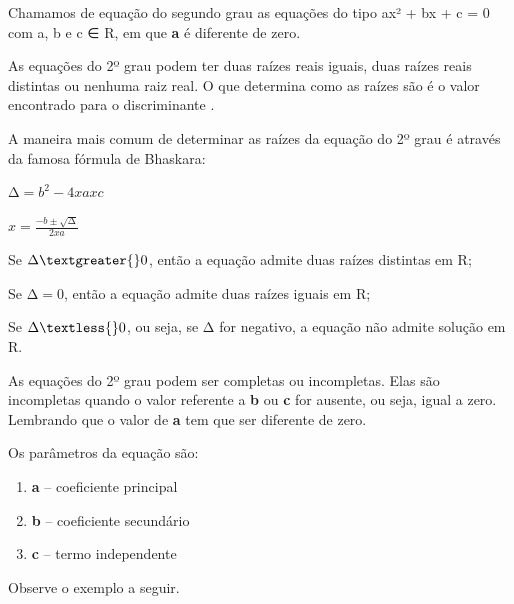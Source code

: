 \begin{escolha}
\begin{boxmedio}
\begin{boxmedio}
{\begin{boxpeq}
\begin{boxpeq}
{\begin{boxpeq}
\begin{boxmedio}
\begin{boxmedio}
\begin{boxpeq}
\begin{boxmedio}
\begin{boxpeq}
\begin{boxpeq}
\begin{boxpeq}
\begin{boxpeq}
\begin{boxmedio}
{\begin{boxmedio}
\begin{boxmedio}
\begin{boxpeq}
\begin{boxmedio}
\begin{boxpeq}
\begin{boxpeq}
\begin{boxpeq}
\begin{escolha}
{\begin{boxmedio}
\begin{boxpeq}
\begin{boxpeq}
\begin{boxpeq}
\begin{boxpeq}
{Chamamos de equação do segundo grau as equações do tipo ax² + bx + c = 0
com a, b e c ∈ R, em que \textbf{a} é diferente de zero.

As equações do 2º grau podem ter duas raízes reais iguais, duas raízes
reais distintas ou nenhuma raiz real. O que determina como as raízes são
é o valor encontrado para o discriminante \mathrm{\Delta}.

A maneira mais comum de determinar as raízes da equação do 2º grau é
através da famosa fórmula de Bhaskara:

$\mathrm{\Delta} = b^{2} - 4 x a x c$

$x = \frac{- b \pm \sqrt{\mathrm{\Delta}}}{2 x a}$

Se $\mathrm{\Delta} \textgreater{}0$, então a equação admite duas raízes distintas em
R;

Se $\mathrm{\Delta} = 0$, então a equação admite duas raízes iguais em R;

Se $\mathrm{\Delta} \textless{}0$, ou seja, se $\mathrm{\Delta}$ for 
negativo, a equação não admite solução em R.

As equações do 2º grau podem ser completas ou incompletas. Elas são
incompletas quando o valor referente a \textbf{b} ou \textbf{c} for
ausente, ou seja, igual a zero. Lembrando que o valor de \textbf{a} tem
que ser diferente de zero.

Os parâmetros da equação são:

\begin{enumerate}
  \item \textbf{a} -- coeficiente principal

  \item \textbf{b} -- coeficiente secundário

  \item \textbf{c} -- termo independente
\end{enumerate}

Observe o exemplo a seguir.

}
\end{boxpeq}
\end{boxpeq}
\end{boxpeq}
\end{boxpeq}
\end{boxmedio}}
\end{escolha}
\end{boxpeq}
\end{boxpeq}
\end{boxpeq}
\end{boxmedio}
\end{boxpeq}
\end{boxmedio}
\end{boxmedio}}
\end{boxmedio}
\end{boxpeq}
\end{boxpeq}
\end{boxpeq}
\end{boxpeq}
\end{boxmedio}
\end{boxpeq}
\end{boxmedio}
\end{boxmedio}
\end{boxpeq}}
\end{boxpeq}
\end{boxpeq}}
\end{boxmedio}
\end{boxmedio}
\end{escolha}
